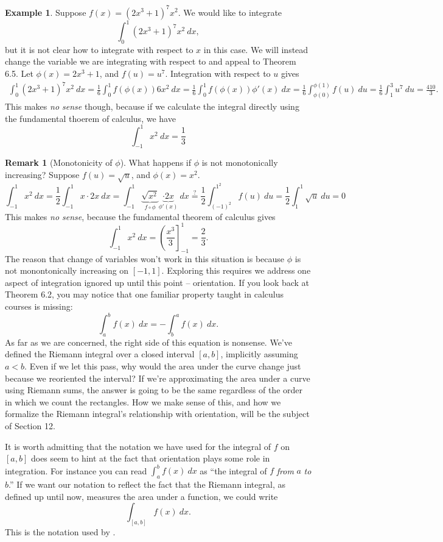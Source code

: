 \documentclass{article}
\theoremstyle{definition}
\newtheorem{example}{Example}[section]
\newtheorem{remark}{Remark}[section]
\begin{document}
	\begin{example}
		Suppose $ f(x)=(2x^3+1)^7x^2 $. We would like to integrate $$\int_{0}^{1} (2x^3+1)^7x^2\ dx, $$ but it is not clear how to integrate with respect to $ x $ in this case. We will instead change the variable we are integrating with respect to and appeal to Theorem 6.5. Let $ \phi(x)=2x^3+1 $, and $ f(u)=u^7 $. Integration with respect to $ u $ gives \begin{align*}
			\int_{0}^{1} (2x^3+1)^7x^2\ dx=\frac{1}{6}\int_{0}^{1} f(\phi(x)) 6x^2\ dx=\frac{1}{6}\int_{0}^{1} f(\phi(x)) \phi'(x)\ dx=\frac{1}{6}\int_{\phi(0)}^{\phi(1)}f(u)\ du=\frac{1}{6}\int_{1}^{3}u^7\ du=\frac{410}{3}.
		\end{align*}
	This makes \textit{no sense} though, because if we calculate the integral directly using the fundamental thoerem of calculus, we have 
	$$ \int_{-1}^1 x^2\ dx = \frac{1}{3}$$ 
	\end{example}
	\begin{remark}[Monotonicity of $\phi$]
		What happens if $\phi$ is not monotonically increasing? Suppose $f(u) = \sqrt u$, and $\phi(x) = x^2$. 
	$$ \int_{-1}^{1}x^2\ dx = \frac{1}{2}\int_{-1}^1{x}\cdot 2x\ dx = \int_{-1}^{1} \underbrace{\sqrt{x^2}}_{f\circ \phi} \underbrace{\cdot 2x}_{\phi'(x)}\ dx \stackrel{?}{=} \frac{1}{2}\int_{(-1)^2}^{1^2} f(u) \ du = \frac{1}{2}\int_1^1 \sqrt u\ du = 0$$
	This makes \textit{no sense}, because the fundamental theorem of calculus gives 
	$$ \int_{-1}^{1} x^2\ dx = \left(\frac{x^3}{3}\right]_{-1}^1 = \frac{2}{3}.$$ The reason that change of variables won't work in this situation is because $\phi$ is not monontonically increasing on $[-1,1]$. Exploring this requires we address one aspect of integration ignored up until this point -- orientation. If you look back at Theorem 6.2, you may notice that one familiar property taught in calculus courses is missing:
	$$ \int_a^b f(x)\ dx = -\int_b^a f(x)\ dx.$$
	As far as we are concerned, the right side of this equation is nonsense. We've defined the Riemann integral over a closed interval $[a,b]$, implicitly assuming $a<b$. Even if we let this pass, why would the area under the curve change just because we reoriented the interval? If we're approximating the area under a curve using Riemann sums, the answer is going to be the same regardless of the order in which we count the rectangles. How we make sense of this, and how we formalize the Riemann integral's relationship with orientation, will be the subject of Section 12. 
	
	It is worth admitting that the notation we have used for the integral of $f$ on $[a,b]$ does seem to hint at the fact that orientation plays some role in integration. For instance you can read $\int_a^b f(x)\ dx$ as ``the integral of $f$ \textit{from} $a$ \textit{to} $b$.'' If we want our notation to reflect the fact that the Riemann integral, as defined up until now, measures the area under a function, we could write 
	$$ \int_{[a,b]} f(x)\ dx.$$ This is the notation used by \cite{tao2006analysis}.
	\end{remark}
\end{document}
